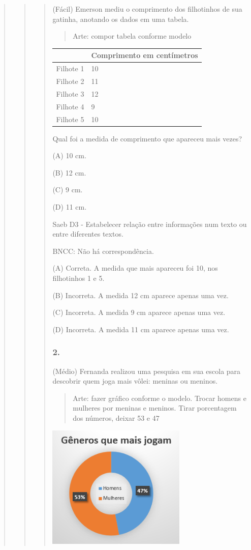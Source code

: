 \begin{quote}
\begin{quote}
\begin{quote}
(Fácil) Emerson mediu o comprimento dos filhotinhos de sua gatinha,
anotando os dados em uma tabela.

\begin{quote}
Arte: compor tabela conforme modelo
\end{quote}

\begin{longtable}[]{@{}ll@{}}
\toprule
& \textbf{Comprimento em centímetros}\tabularnewline
\midrule
\endhead
Filhote 1 & 10\tabularnewline
Filhote 2 & 11\tabularnewline
Filhote 3 & 12\tabularnewline
Filhote 4 & 9\tabularnewline
Filhote 5 & 10\tabularnewline
\bottomrule
\end{longtable}

Qual foi a medida de comprimento que apareceu mais vezes?

(A) 10 cm.

(B) 12 cm.

(C) 9 cm.

(D) 11 cm.

Saeb D3 - Estabelecer relação entre informações num texto ou entre
diferentes textos.

BNCC: Não há correspondência.

(A) Correta. A medida que mais apareceu foi 10, nos filhotinhos 1 e 5.

(B) Incorreta. A medida 12 cm aparece apenas uma vez.

(C) Incorreta. A medida 9 cm aparece apenas uma vez.

(D) Incorreta. A medida 11 cm aparece apenas uma vez.

\subsubsection{2. }\label{section-69}

(Médio) Fernanda realizou uma pesquisa em sua escola para descobrir quem
joga mais vôlei: meninas ou meninos.

\begin{quote}
Arte: fazer gráfico conforme o modelo. Trocar homens e mulheres por
meninas e meninos. Tirar porcentagem dos números, deixar 53 e 47
\end{quote}

\includegraphics[width=2.60244in,height=2.32558in]{media/image31.png}


\end{quote}
\end{quote}
\end{quote}
